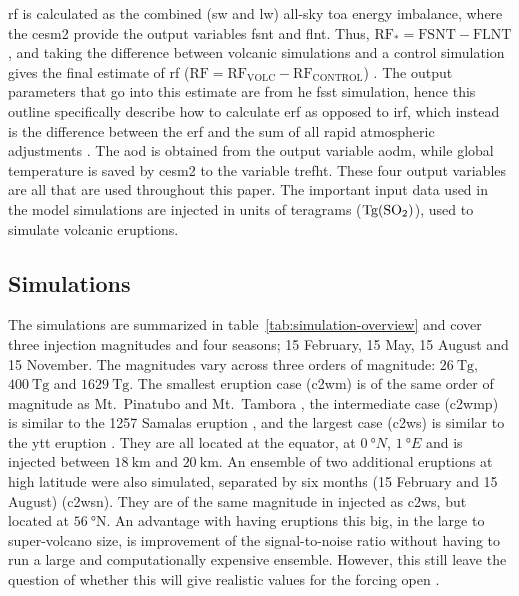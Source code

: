 \documentclass{ametsocV6.1}
\newcommand{\iso}[1][i]{{#1}njected \ce{SO2}}
\begin{document}
\gls{rf} is calculated as the combined (\gls{sw} and \gls{lw}) all-sky \gls{toa} energy
imbalance, where the \gls{cesm2} provide the output variables \gls{fsnt} and \gls{flnt}.
Thus, \(\mathrm{RF_*}= \mathrm{FSNT} - \mathrm{FLNT}\), and taking the difference
between volcanic simulations and a control simulation gives the final estimate of
\gls{rf} (\(\mathrm{RF}=\mathrm{RF_{VOLC}}-\mathrm{RF_{CONTROL}}\))
\citep{marshall2020}. The output parameters that go into this estimate are from he
\gls{fsst} simulation, hence this outline specifically describe how to calculate
\gls{erf} as opposed to \gls{irf}, which instead is the difference between the \gls{erf}
and the sum of all rapid atmospheric adjustments \citep{marshall2020,smith2018}. The
\gls{aod} is obtained from the output variable \gls{aodm}, while global temperature is
saved by \gls{cesm2} to the variable \gls{trefht}. These four output variables are all
that are used throughout this paper. The important input data used in the model
simulations are \iso{} in units of teragrams (\(\si{\tera\gram(\ce{SO2})}\)), used to
simulate volcanic eruptions.

\subsection{Simulations}

The simulations are summarized in table~\ref{tab:simulation-overview} and cover three
 injection magnitudes and four seasons; 15 February, 15 May, 15 August and 15
November. The magnitudes vary across three orders of magnitude: \(\SI{26}{\tera\gram}\),
\(\SI{400}{\tera\gram}\) and \(\SI{1629}{\tera\gram}\). The smallest eruption case
(\gls{c2wm}) is of the same order of magnitude as Mt.\ Pinatubo
\citep[\(\sim10\)--\(\SI{20}{\tera\gram}\);~e.g.][]{timmreck2018} and Mt.\ Tambora
\citep[\(\sim\SI{56.2}{\tera\gram}\);~e.g.][]{zanchettin2016}, the intermediate case
(\gls{c2wmp}) is similar to the 1257 Samalas eruption
\citep[\(\sim{118.8}\)--\(\SI{173.1}{\tera\gram}\);~e.g.][]{toohey2017,ottobliesner2016},
and the largest case (\gls{c2ws}) is similar to the \gls{ytt} eruption
\citep[\(100\)--\(\SI{10000}{\tera\gram}\);~e.g.][]{jones2005}. They are all located at
the equator, at \(\SI{0}{\degree N}\), \(\SI{1}{\degree E}\) and  is injected
between \(\SI{18}{\kilo\meter}\) and \(\SI{20}{\kilo\meter}\). An ensemble of two
additional eruptions at high latitude were also simulated, separated by six months (15
February and 15 August) (\gls{c2wsn}). They are of the same magnitude in \iso{} as
\gls{c2ws}, but located at \(\SI{56}{\degree \mathrm{N}}\). An advantage with having
eruptions this big, in the large to super-volcano size, is improvement of the
signal-to-noise ratio without having to run a large and computationally expensive
ensemble. However, this still leave the question of whether this will give realistic
values for the forcing open \citep{gregory2016}.
\end{document}
